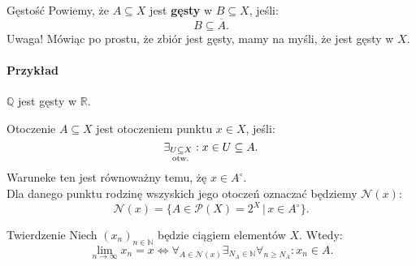 \documentclass{article}
\newcommand{\R}{\mathbb{R}}
\newcommand{\N}{\mathbb{N}}
\newcommand{\Q}{\mathbb{Q}}
\newcommand{\oo}{\infty}
\newcommand{\Nau}{\mathcal{N}}
\newcommand{\subotw}{\underset{\clap{\scriptsize otw.}}{\subseteq}}
\newcommand{\dg}{^{\circ}}
\newcommand{\ciag}[1]{(#1_{n})_{n \in \N}}
\begin{document}
    \begin{defr}{Gęstość}
        Powiemy, że $A \subseteq X$ jest \textbf{gęsty} w $B \subseteq X$, jeśli: \begin{equation}
            B \subseteq \overline{A}.
        \end{equation}
        Uwaga! Mówiąc po prostu, że zbiór jest gęsty, mamy na myśli, że jest gęsty w $X$.
    \end{defr}
    \paragraph*{Przykład} $\Q$ jest gęsty w $\R$.

    \begin{defr}{Otoczenie}
        $A \subseteq X$ jest otoczeniem punktu $x \in X$, jeśli: \begin{equation}
            \exists_{U \subotw X}: x \in U \subseteq A.
        \end{equation} Waruneke ten jest równoważny temu, żę $x \in A \dg$. \\
        Dla danego punktu rodzinę wszyskich jego otoczeń oznaczać będziemy $\Nau (x)$: \begin{equation}
            \Nau (x) = \{ A \in \mathcal{P}(X) = 2^X \, \big| \, x \in A\dg \}. 
        \end{equation}
    \end{defr}

    \begin{twier}{Twierdzenie}
        Niech $\ciag{x}$ będzie ciągiem elementów $X$. Wtedy:\begin{equation}
            \lim_{n \to \oo} x_n = x \iff \forall_{A \in \Nau(x)} \exists_{N_A \in \N} \forall_{n \geqslant N_A}: x_n \in A.
        \end{equation}
    \end{twier}
\end{document}

